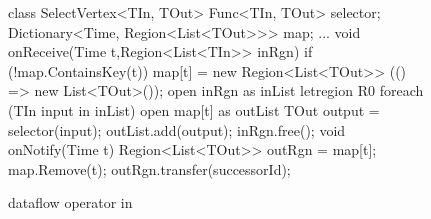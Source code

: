 \begin{figure}[t!]
\begin{numcodejava}
class SelectVertex<TIn, TOut> {
  Func<TIn, TOut> selector;
  Dictionary<Time, Region<List<TOut>>> map;
  ...
  void onReceive(Time t,Region<List<TIn>> inRgn){
    if (!map.ContainsKey(t))
       map[t] = new Region<List<TOut>> (() => new List<TOut>());
    open inRgn as inList {
      letregion R0 {
        foreach (TIn input in inList) {
          open map[t] as outList {
            TOut output = selector(input);
            outList.add(output); } } } }
    inRgn.free();
  }
  void onNotify(Time t) {
     Region<List<TOut>> outRgn = map[t];
     map.Remove(t);
     outRgn.transfer(successorId);
  }
}
\end{numcodejava}
\caption{ dataflow operator in \name}
\label{fig:motivating-eg-in-broom}
\vspace*{-0.15in}
\end{figure}
